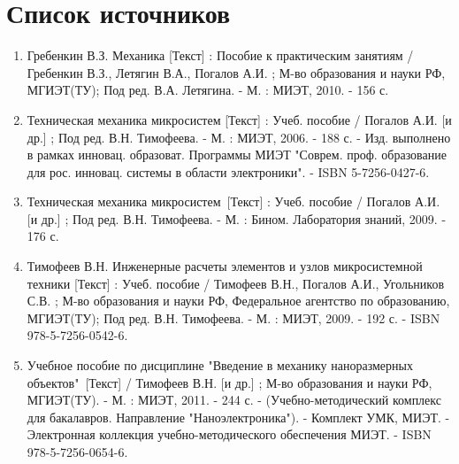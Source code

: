 \chapter{Список источников}

\begin{enumerate}
    \item Гребенкин В.З. Механика [Текст] : Пособие к практическим занятиям / Гребенкин В.З., Летягин В.А., Погалов А.И. ; М-во образования и науки РФ, МГИЭТ(ТУ); Под ред. В.А. Летягина. - М. : МИЭТ, 2010. - 156 с.
    \item Техническая механика микросистем [Текст] : Учеб. пособие / Погалов А.И. [и др.] ; Под ред. В.Н. Тимофеева. - М. : МИЭТ, 2006. - 188 с. - Изд. выполнено в рамках инновац. образоват. Программы МИЭТ "Соврем. проф. образование для рос. инновац. системы в области электроники". - ISBN 5-7256-0427-6.
    \item Техническая механика микросистем [Текст] : Учеб. пособие / Погалов А.И. [и др.] ; Под ред. В.Н. Тимофеева. - М. : Бином. Лаборатория знаний, 2009. - 176 с. 
    \item Тимофеев В.Н. Инженерные расчеты элементов и узлов микросистемной техники [Текст] : Учеб. пособие / Тимофеев В.Н., Погалов А.И., Угольников С.В. ; М-во образования и науки РФ, Федеральное агентство по образованию, МГИЭТ(ТУ); Под ред. В.Н. Тимофеева. - М. : МИЭТ, 2009. - 192 с. - ISBN 978-5-7256-0542-6.
    \item Учебное пособие по дисциплине "Введение в механику наноразмерных объектов" [Текст] / Тимофеев В.Н. [и др.] ; М-во образования и науки РФ, МГИЭТ(ТУ). - М. : МИЭТ, 2011. - 244 с. - (Учебно-методический комплекс для бакалавров. Направление "Наноэлектроника"). - Комплект УМК, МИЭТ. - Электронная коллекция учебно-методического обеспечения МИЭТ. - ISBN 978-5-7256-0654-6.
\end{enumerate}
